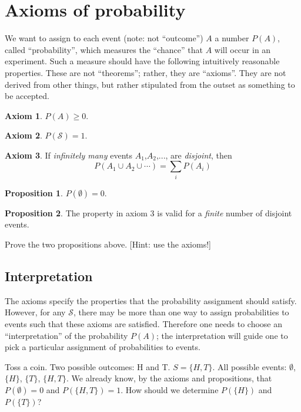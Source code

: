 \documentclass[12pt]{article}
\begin{document}
\section{Axioms of probability}

We want to assign to each event (note: not ``outcome'') $A$ a number $P(A)$, called
``probability'', which measures the ``chance'' that $A$ will occur in an
experiment.
Such a measure should have the following intuitively reasonable
properties. These are not ``theorems''; rather, they are
``axioms''. They are not derived from other things,
but rather stipulated from the outset as something to be accepted.

\textbf{Axiom 1}. $P(A) \ge 0$.

\textbf{Axiom 2}. $P(\mathcal{S}) = 1$.

\textbf{Axiom 3}. If \emph{infinitely many} events $A_1$,$A_2$,...,
    are \emph{disjoint}, then
    \[ P(A_1 \cup A_2 \cup \dotsb) = \sum_i P(A_i) \]

\medskip

\textbf{Proposition 1}. $P(\emptyset) = 0$.

\textbf{Proposition 2}. The property in axiom 3 is valid for a
\emph{finite} number of disjoint events.

\example Prove the two propositions above. [Hint: use the axioms!]

\subsection*{Interpretation}

The axioms specify the properties that the probability assignment should
satisfy. However, for any $\mathcal{S}$, there may be more than one
way to assign probabilities to events such that these axioms are
satisfied.
Therefore one needs to choose an ``interpretation'' of the probability
$P(A)$; the interpretation will guide one to pick
a particular assignment of probabilities to events.

\example
Toss a coin. Two possible outcomes: H and T.
$S = \{H, T\}$.
All possible events:
$\emptyset$, $\{H\}$, $\{T\}$,
$\{H, T\}$.
We already know, by the axioms and propositions, that
$P(\emptyset) = 0$ and $P(\{H,T\}) = 1$.
How should we determine $P(\{H\})$ and $P(\{T\})$?

\end{document}
